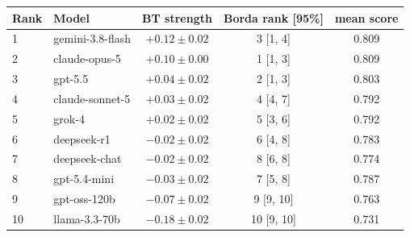 \begin{tabular}{llccc}
\toprule
Rank & Model & BT strength & Borda rank [95\%] & mean score \\
\midrule
1 & gemini-3.8-flash & $+0.12 \pm 0.02$ & 3 [1, 4] & 0.809 \\
2 & claude-opus-5 & $+0.10 \pm 0.00$ & 1 [1, 3] & 0.809 \\
3 & gpt-5.5 & $+0.04 \pm 0.02$ & 2 [1, 3] & 0.803 \\
4 & claude-sonnet-5 & $+0.03 \pm 0.02$ & 4 [4, 7] & 0.792 \\
5 & grok-4 & $+0.02 \pm 0.02$ & 5 [3, 6] & 0.792 \\
6 & deepseek-r1 & $-0.02 \pm 0.02$ & 6 [4, 8] & 0.783 \\
7 & deepseek-chat & $-0.02 \pm 0.02$ & 8 [6, 8] & 0.774 \\
8 & gpt-5.4-mini & $-0.03 \pm 0.02$ & 7 [5, 8] & 0.787 \\
9 & gpt-oss-120b & $-0.07 \pm 0.02$ & 9 [9, 10] & 0.763 \\
10 & llama-3.3-70b & $-0.18 \pm 0.02$ & 10 [9, 10] & 0.731 \\
\bottomrule
\end{tabular}
